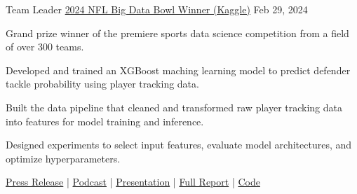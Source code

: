 

\begin{cventries}
    
\cventry
{Team Leader} %
{\href{https://operations.nfl.com/gameday/analytics/big-data-bowl/2024-big-data-bowl-winner-and-finalists/}{2024 NFL Big Data Bowl Winner (Kaggle)}}
{} %
{Feb 29, 2024} %
{
  \begin{cvitems} %
    \item {Grand prize winner of the premiere sports data science competition from a field of over 300 teams.}
    \item {Developed and trained an XGBoost maching learning model to predict defender tackle probability using player tracking data.}
    \item {Built the data pipeline that cleaned and transformed raw player tracking data into features for model training and inference.}
    \item {Designed experiments to select input features, evaluate model architectures, and optimize hyperparameters.}
    \item {\href{https://operations.nfl.com/gameday/analytics/big-data-bowl/2024-big-data-bowl-winner-and-finalists/}{Press Release} | \href{https://www.trumedianetworks.com/expected-value-podcast/2024/3/12/matt-chang-nfl-big-data-bowl-winner}{Podcast} | \href{https://www.loom.com/share/54c67d584ee34efbb799e8dbbd551091}{Presentation} | \href{https://www.kaggle.com/code/matthewpchang/uncovering-missed-tackle-opportunities}{Full Report} | \href{https://github.com/mpchang/uncovering-missed-tackle-opportunities}{Code}}
  \end{cvitems}
}

\end{cventries}
